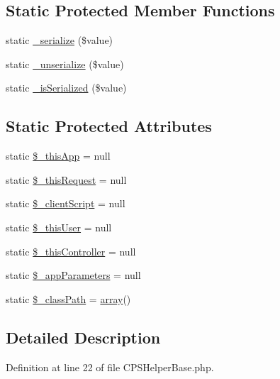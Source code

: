 \subsection*{Static Protected Member Functions}
\begin{DoxyCompactItemize}
\item 
static \hyperlink{classCPSHelperBase_af7a9c5672451dd6c272f29549ca73031}{\_\-serialize} (\$value)
\item 
static \hyperlink{classCPSHelperBase_ad0529f408772d761908d3a4aaa7a895a}{\_\-unserialize} (\$value)
\item 
static \hyperlink{classCPSHelperBase_a9d036f61793a71d5c351031d2ecc0e53}{\_\-isSerialized} (\$value)
\end{DoxyCompactItemize}
\subsection*{Static Protected Attributes}
\begin{DoxyCompactItemize}
\item 
static \hyperlink{classCPSHelperBase_af6f88e94a08d7714446e9d14aec8eccd}{\$\_\-thisApp} = null
\item 
static \hyperlink{classCPSHelperBase_ab300f41b1bfad0b7fbf250eb7fb46eea}{\$\_\-thisRequest} = null
\item 
static \hyperlink{classCPSHelperBase_a7e5fa1f4672a5a8a8ddb2d96bea86daa}{\$\_\-clientScript} = null
\item 
static \hyperlink{classCPSHelperBase_a942de4b5bc91566b1ca1452da4166059}{\$\_\-thisUser} = null
\item 
static \hyperlink{classCPSHelperBase_a32cb14890abc35b436e106a457c6ca97}{\$\_\-thisController} = null
\item 
static \hyperlink{classCPSHelperBase_ace966ab0b5f00686b49f86b4d4a664a2}{\$\_\-appParameters} = null
\item 
static \hyperlink{classCPSHelperBase_a3f47ff234cfea41e28e030bbf75c56eb}{\$\_\-classPath} = \hyperlink{list_8php_aa3205d038c7f8feb5c9f01ac4dfadc88}{array}()
\end{DoxyCompactItemize}


\subsection{Detailed Description}


Definition at line 22 of file CPSHelperBase.php.



